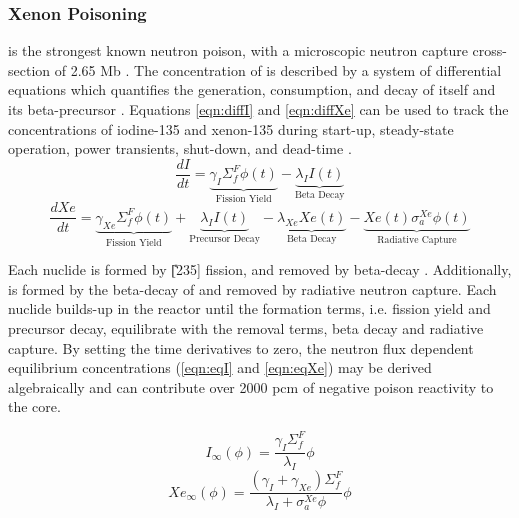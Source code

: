 \subsubsection{Xenon Poisoning}
\Xe is the strongest known neutron poison, with a microscopic neutron capture cross-section of 2.65 Mb \cite[Table II.2]{Lamarsh}. The concentration of \Xe is described by a system of differential equations which quantifies the generation, consumption, and decay of itself and its beta-precursor \I. Equations \ref{eqn:diffI} and \ref{eqn:diffXe} can be used to track the concentrations of iodine-135 and xenon-135 during start-up, steady-state operation, power transients, shut-down, and dead-time \cite[Ch. 7]{Lamarsh}.
\begin{equation}\label{eqn:diffI}
    \frac{dI}{dt} =
    \underbrace{\gamma_{I}\Sigma_{f}^{F}{\phi}(t)}_{\text{Fission Yield}}
    -\underbrace{\lambda_{I}I(t)}_{\text{Beta Decay}}
\end{equation}
\begin{equation}\label{eqn:diffXe}
        \frac{dXe}{dt} =
        \underbrace{\gamma_{Xe}\Sigma_{f}^{F}{\phi}(t)}_{\text{Fission Yield}}
        +
        \underbrace{\lambda_{I}I(t)}_{\text{Precursor Decay}}
        -
        \underbrace{\lambda_{Xe}Xe(t)}_{\text{Beta Decay}}
        -
        \underbrace{Xe(t)\sigma_{a}^{Xe}{\phi}(t)}_{\text{Radiative Capture}}
\end{equation}

Each nuclide is formed by \U[235] fission, and removed by beta-decay \cite{RootXe}. Additionally, \Xe is formed by the beta-decay of \I and removed by radiative neutron capture. Each nuclide builds-up in the reactor until the formation terms, i.e. fission yield and precursor decay, equilibrate with the removal terms, beta decay and radiative capture. By setting the time derivatives to zero, the neutron flux dependent equilibrium concentrations (\ref{eqn:eqI} and \ref{eqn:eqXe}) may be derived algebraically \cite[Ch. 7]{Lamarsh} and can contribute over 2000 pcm of negative poison reactivity to the core. 
 
\begin{equation}\label{eqn:eqI}
    I_{\infty}(\phi) = \frac{\gamma_I \Sigma_f^F }{\lambda_I}\phi
\end{equation}
\begin{equation}\label{eqn:eqXe}
    Xe_{\infty}(\phi) = \frac{(\gamma_I+\gamma_{Xe}) \Sigma_f^F }{\lambda_I+\sigma_a^{Xe}\phi}\phi
\end{equation}


